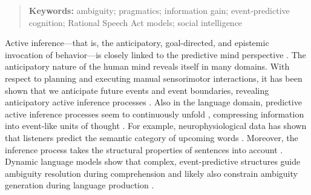 \documentclass[10pt,a4paper]{article}
\begin{document}
\begin{abstract}

\textbf{Keywords:} 
ambiguity; pragmatics; information gain; event-predictive cognition; Rational Speech Act models; social intelligence
\end{abstract}


\noindent Active inference---that is, the anticipatory, goal-directed, and epistemic invocation of behavior---is
closely linked to the predictive mind perspective \cite{Friston:2015,Hohwy:2013,Clark:2016}. 
The anticipatory nature of the human mind reveals itself in many domains.
With respect to planning and executing manual sensorimotor interactions, 
it has been shown that we anticipate future events and event boundaries, revealing anticipatory active inference processes \cite{belardinelli2016s, belardinelli2018mental,Friston:2015,Hayhoe:2003,lohmann2019hands}.
Also in the language domain, predictive active inference processes seem to continuously unfold \cite{Christiansen:2016}, compressing information into event-like units of thought \cite{Gaerdenfors:2014}.
For example, neurophysiological data has shown that listeners predict the semantic category of upcoming words \cite{federmeier2002picture}.
Moreover, the inference process takes the structural properties of sentences into account \cite{levy2008expectation}.
Dynamic language models show that complex, event-predictive structures guide ambiguity resolution during comprehension and likely also constrain ambiguity generation during language production \cite{Elman:2019}. 
\end{document}
